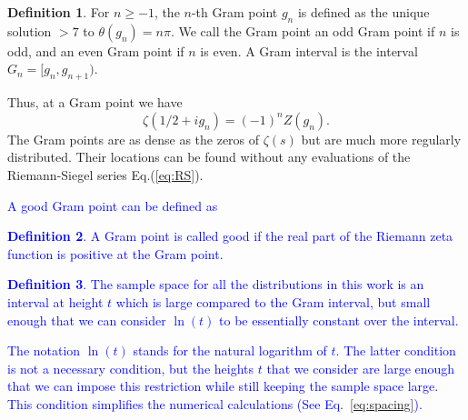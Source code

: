 \documentclass[twoside]{article}
\theoremstyle{definition}
\newtheorem{defn}{Definition}
\begin{document}
\begin{defn}\label{gram}
For $n \ge -1$, the $n$-th Gram point $g_n$ is defined as the unique solution $> 7$ to
$\theta (g_n) = n\pi$. We call the Gram point an odd Gram point if $n$ is odd, and an even Gram point if $n$ is even.
A Gram interval is the interval $G_n = [g_n,g_{n+1})$.
\end{defn}
Thus, at a Gram point we have
\begin{equation}
\zeta(1/2+ig_n) = (-1)^{n}Z(g_n).
\label{eq:zetagram}
\end{equation}
The Gram points are as dense as the zeros of $\zeta(s)$ but are much more regularly distributed.
Their locations can be found without any evaluations of the Riemann-Siegel series Eq.(\ref{eq:RS}).
\textcolor{blue}{A good Gram point can be defined as 
\begin{defn}\label{good0}
A Gram point is called good if the real part of the Riemann zeta function is positive at the Gram point.
\end{defn}
\begin{defn}\label{samplespace}The sample space for all the distributions in this work is an interval  at height $t$ which is large compared to the Gram interval, but small enough that we can consider {$\ln (t)$} to be essentially constant over the interval. 
\end{defn}
The notation $\ln (t)$ stands for the natural logarithm of $t$. The latter condition is not a necessary condition, but the heights $t$ that we consider are large enough that we can impose this restriction while still keeping the sample space large. This condition simplifies the numerical calculations (See Eq.~\ref{eq:spacing}). 
}
\end{document}
